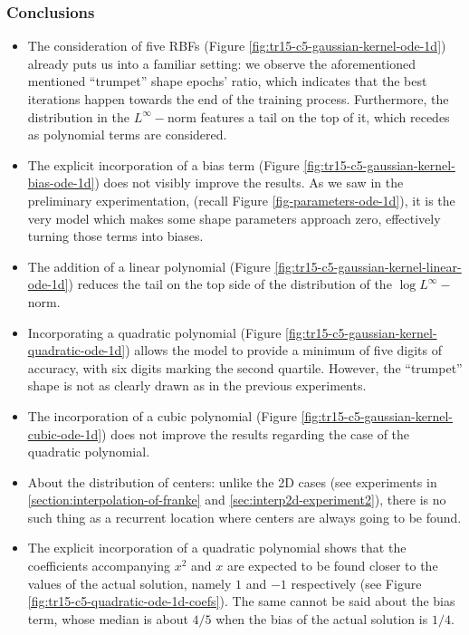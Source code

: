 \documentclass[12pt]{report} %
\begin{document}
\subsubsection*{Conclusions}

\begin{itemize}
  \item The consideration of five RBFs (Figure \ref{fig:tr15-c5-gaussian-kernel-ode-1d})
        already puts us into a familiar setting:
        we observe the aforementioned mentioned ``trumpet'' shape epochs' ratio, which indicates that
        the best iterations happen towards the end of the training process.
        Furthermore, the distribution in the $L^\infty-$norm features a tail on the top of it, which
        recedes as polynomial terms are considered.
  \item The explicit incorporation of a bias term (Figure \ref{fig:tr15-c5-gaussian-kernel-bias-ode-1d})
        does not visibly improve the results. As we saw in the preliminary experimentation,
        (recall Figure \ref{fig-parameters-ode-1d}), it is the very model which makes some shape
        parameters approach zero, effectively turning those terms into biases.
  \item The addition of a linear polynomial (Figure \ref{fig:tr15-c5-gaussian-kernel-linear-ode-1d})
        reduces the tail on the top side of the distribution of the $\log L^\infty-$norm.
  \item Incorporating a quadratic polynomial (Figure \ref{fig:tr15-c5-gaussian-kernel-quadratic-ode-1d})
        allows the model to provide a minimum of five digits of accuracy, with six digits marking
        the second quartile. However, the ``trumpet'' shape is not as clearly drawn as in the previous
        experiments.
  \item The incorporation of a cubic polynomial (Figure \ref{fig:tr15-c5-gaussian-kernel-cubic-ode-1d})
        does not improve the results regarding the case of the quadratic polynomial.
  \item About the distribution of centers: unlike the 2D cases (see experiments in
        \ref{section:interpolation-of-franke} and \ref{sec:interp2d-experiment2}),
        there is no such thing as a recurrent
        location where centers are always going to be found.
  \item The explicit incorporation of a quadratic polynomial shows that the coefficients accompanying $x^2$ and $x$ are expected to be found closer to the values of the actual solution, namely $1$ and $-1$ respectively (see Figure \ref{fig:tr15-c5-quadratic-ode-1d-coefs}). The same cannot be said about the bias term, whose median is about $4/5$ when the bias of the actual solution is $1/4$.
\end{itemize}
\end{document}
